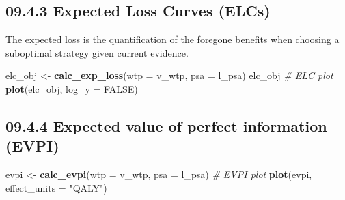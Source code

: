 \documentclass[]{article}
\newenvironment{Shaded}{\begin{snugshade}}{\end{snugshade}}
\newcommand{\KeywordTok}[1]{\textcolor[rgb]{0.13,0.29,0.53}{\textbf{#1}}}
\newcommand{\DataTypeTok}[1]{\textcolor[rgb]{0.13,0.29,0.53}{#1}}
\newcommand{\StringTok}[1]{\textcolor[rgb]{0.31,0.60,0.02}{#1}}
\newcommand{\CommentTok}[1]{\textcolor[rgb]{0.56,0.35,0.01}{\textit{#1}}}
\newcommand{\OtherTok}[1]{\textcolor[rgb]{0.56,0.35,0.01}{#1}}
\newcommand{\NormalTok}[1]{#1}
\begin{document}
\subsection{09.4.3 Expected Loss Curves
(ELCs)}\label{expected-loss-curves-elcs}

The expected loss is the quantification of the foregone benefits when
choosing a suboptimal strategy given current evidence.

\begin{Shaded}
\begin{Highlighting}[]
\NormalTok{elc_obj <-}\StringTok{ }\KeywordTok{calc_exp_loss}\NormalTok{(}\DataTypeTok{wtp =}\NormalTok{ v_wtp, }\DataTypeTok{psa =}\NormalTok{ l_psa)}
\NormalTok{elc_obj}
\CommentTok{# ELC plot}
\KeywordTok{plot}\NormalTok{(elc_obj, }\DataTypeTok{log_y =} \OtherTok{FALSE}\NormalTok{)}
\end{Highlighting}
\end{Shaded}

\subsection{09.4.4 Expected value of perfect information
(EVPI)}\label{expected-value-of-perfect-information-evpi}

\begin{Shaded}
\begin{Highlighting}[]
\NormalTok{evpi <-}\StringTok{ }\KeywordTok{calc_evpi}\NormalTok{(}\DataTypeTok{wtp =}\NormalTok{ v_wtp, }\DataTypeTok{psa =}\NormalTok{ l_psa)}
\CommentTok{# EVPI plot}
\KeywordTok{plot}\NormalTok{(evpi, }\DataTypeTok{effect_units =} \StringTok{"QALY"}\NormalTok{)}
\end{Highlighting}
\end{Shaded}
\end{document}
